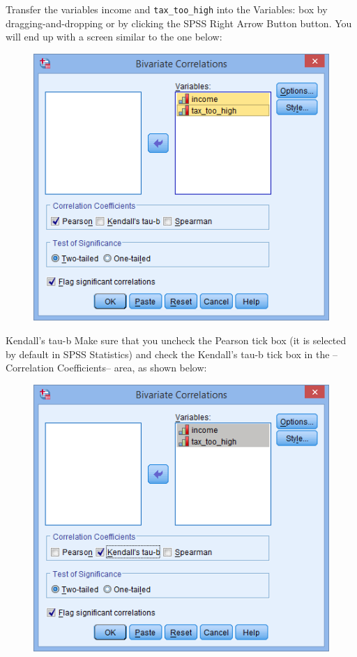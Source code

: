 \documentclass[]{article}
\begin{document}
Transfer the variables income and \texttt{tax\_too\_high} into the Variables: box by dragging-and-dropping or by clicking the SPSS Right Arrow Button button. You will end up with a screen similar to the one below:
\begin{figure}
\centering
\includegraphics[width=0.7\linewidth]{images/options-example-kendalls-tau-b}
\caption{}
\label{fig:options-example-kendalls-tau-b}
\end{figure}

Kendall's tau-b
Make sure that you uncheck the Pearson tick box (it is selected by default in SPSS Statistics) and check the Kendall's tau-b tick box in the –Correlation Coefficients– area, as shown below:
\begin{figure}
\centering
\includegraphics[width=0.7\linewidth]{images/options-example-2-kendalls-tau-b}
\caption{}
\label{fig:options-example-2-kendalls-tau-b}
\end{figure}
\end{document}
